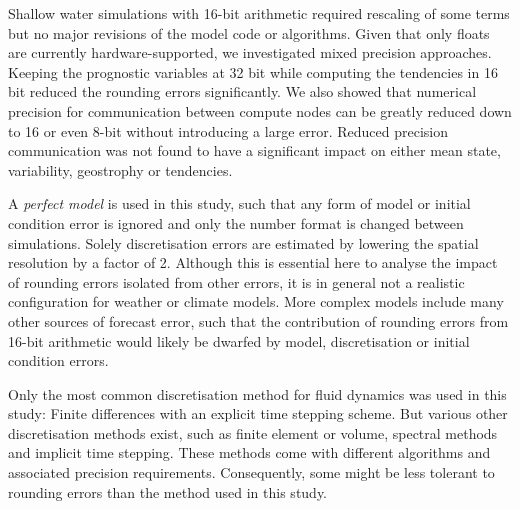 \documentclass[draft]{agujournal2019}
\begin{document}
Shallow water simulations with 16-bit arithmetic required rescaling of some terms
but no major revisions of the model code or algorithms. Given that only floats are
currently hardware-supported, we investigated mixed precision approaches.
Keeping the prognostic variables at 32 bit while computing the tendencies in 16 bit
reduced the rounding errors significantly. We also showed that numerical precision
for communication between compute nodes can be greatly reduced down to 16 or
even 8-bit without introducing a large error. Reduced precision communication was
not found to have a significant impact on either mean state, variability,
geostrophy or tendencies.

A \emph{perfect model} is used in this study, such that any form
of model or initial condition error is ignored and only the number format is
changed between simulations. Solely discretisation errors are estimated by
lowering the spatial resolution by a factor of 2. Although this is essential
here to analyse the impact of rounding errors isolated from other errors, it
is in general not a realistic configuration for weather or climate models. More
complex models include many other sources of forecast error, such that the
contribution of rounding errors from 16-bit arithmetic would likely be dwarfed by
model, discretisation or initial condition errors.

Only the most common discretisation method for fluid dynamics was used in
this study: Finite differences with an explicit time stepping scheme. But various
other discretisation methods exist, such as finite element or volume, spectral
methods and implicit time stepping. These methods come with different algorithms
and associated precision requirements. Consequently, some might be
less tolerant to rounding errors than the method used in this study.

\end{document}

